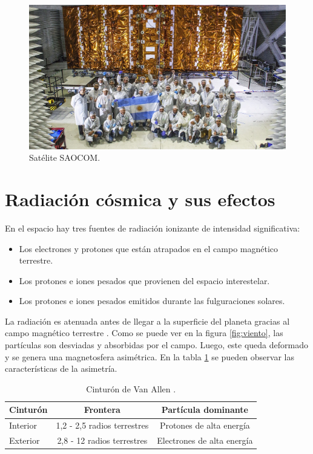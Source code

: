 \begin{figure}[htbp]
	\centering
	\includegraphics[width=\textwidth]{./Figures/invapsaocom.jpg}
	\caption{Satélite SAOCOM\protect\footnotemark.}
	\label{fig:saocom}
\end{figure}


\section{Radiación cósmica y sus efectos}
\label{sec:radiacion}

En el espacio hay tres fuentes de radiación ionizante de intensidad significativa:

\begin{itemize}
    \item Los electrones y protones que están atrapados en el campo magnético terrestre.
    \item Los protones e iones pesados que provienen del espacio interestelar.
    \item Los protones e iones pesados emitidos durante las fulguraciones solares.
\end{itemize}

La radiación es atenuada antes de llegar a la superficie del planeta gracias al campo magnético terrestre \citep{WEBSITE:structure_space_radiation}.
Como se puede ver en la figura \ref{fig:viento}, las partículas son desviadas y absorbidas por el campo.
Luego, este queda deformado y se genera una magnetosfera asimétrica.
En la tabla \ref{tab:capasmagneticas} se pueden observar las características de la asimetría.

\begin{table}[h]
	\centering
	\caption[Cinturón de Van Allen]{Cinturón de Van Allen \citep{WEBSITE:structure_space_radiation}.}
	\begin{tabular}{l c c}    
		\toprule
		\textbf{Cinturón} & \textbf{Frontera}           & \textbf{Partícula dominante}\\
		\midrule
		Interior          & 1,2 - 2,5 radios terrestres & Protones de alta energía\\		
		Exterior          & 2,8 - 12 radios terrestres  & Electrones de alta energía\\
		\bottomrule
		\hline
	\end{tabular}
	\label{tab:capasmagneticas}
\end{table}

